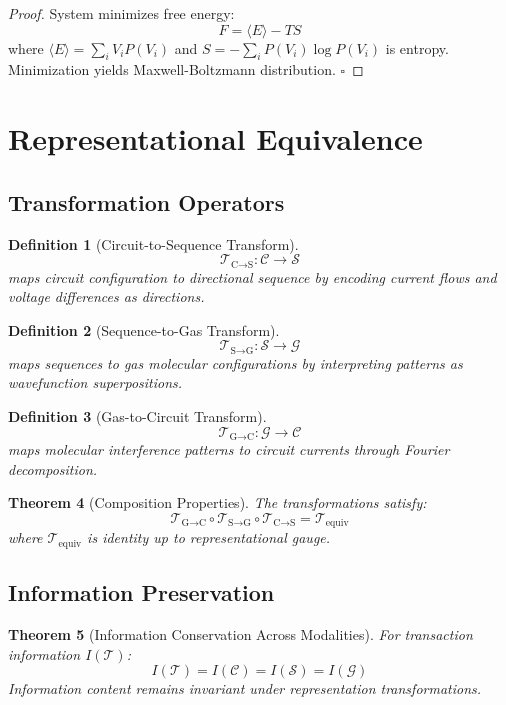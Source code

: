 \documentclass[12pt]{article}
\newtheorem{theorem}{Theorem}
\newtheorem{definition}[theorem]{Definition}
\begin{document}
\begin{proof}
System minimizes free energy:
$$
F = \langle E \rangle - T S
$$
where $\langle E \rangle = \sum_i V_i P(V_i)$ and $S = -\sum_i P(V_i) \log P(V_i)$ is entropy. Minimization yields Maxwell-Boltzmann distribution.
$\square$
\end{proof}

\section{Representational Equivalence}

\subsection{Transformation Operators}

\begin{definition}[Circuit-to-Sequence Transform]
$$
\mathcal{T}_{\text{C→S}}: \mathcal{C} \to \mathcal{S}
$$
maps circuit configuration to directional sequence by encoding current flows and voltage differences as directions.
\end{definition}

\begin{definition}[Sequence-to-Gas Transform]
$$
\mathcal{T}_{\text{S→G}}: \mathcal{S} \to \mathcal{G}
$$
maps sequences to gas molecular configurations by interpreting patterns as wavefunction superpositions.
\end{definition}

\begin{definition}[Gas-to-Circuit Transform]
$$
\mathcal{T}_{\text{G→C}}: \mathcal{G} \to \mathcal{C}
$$
maps molecular interference patterns to circuit currents through Fourier decomposition.
\end{definition}

\begin{theorem}[Composition Properties]
The transformations satisfy:
$$
\mathcal{T}_{\text{G→C}} \circ \mathcal{T}_{\text{S→G}} \circ \mathcal{T}_{\text{C→S}} = \mathcal{T}_{\text{equiv}}
$$
where $\mathcal{T}_{\text{equiv}}$ is identity up to representational gauge.
\end{theorem}

\subsection{Information Preservation}

\begin{theorem}[Information Conservation Across Modalities]
For transaction information $I(\mathcal{T})$:
$$
I(\mathcal{T}) = I(\mathcal{C}) = I(\mathcal{S}) = I(\mathcal{G})
$$
Information content remains invariant under representation transformations.
\end{theorem}
\end{document}
